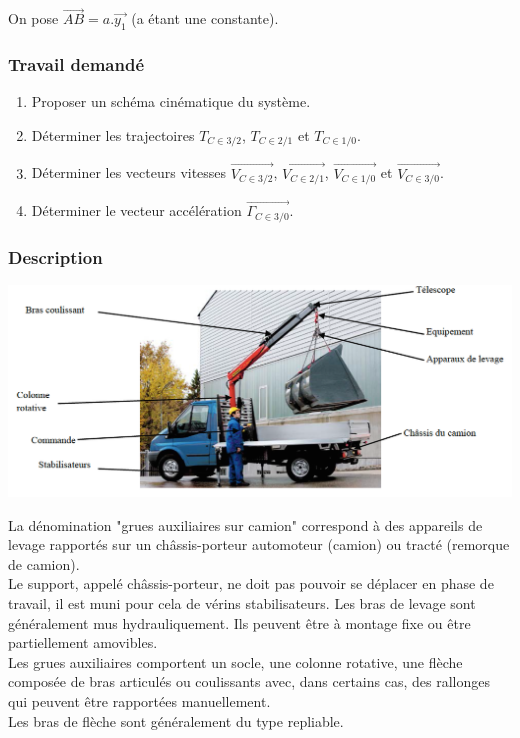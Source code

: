 On pose $\overrightarrow{AB} = a.\overrightarrow{y_1}$ (a étant une constante).

\subsubsection{Travail demandé}
\begin{enumerate}
\item Proposer un schéma cinématique du système.
\item Déterminer les trajectoires $T_{C\in3/2}$, $T_{C\in2/1}$ et $T_{C\in1/0}$.
\item Déterminer les vecteurs vitesses $\overrightarrow{V_{C\in3/2}}$, $\overrightarrow{V_{C\in2/1}}$, $\overrightarrow{V_{C\in1/0}}$ et $\overrightarrow{V_{C\in3/0}}$.
\item Déterminer le vecteur accélération $\overrightarrow{\Gamma_{C\in3/0}}$.
\end{enumerate}

\newpage



\subsubsection{Description}

\begin{center}
    \includegraphics[scale=0.3]{png/1_exo8.png}
\end{center}

La dénomination "grues auxiliaires sur camion" correspond à des appareils de levage rapportés sur un châssis-porteur automoteur (camion) ou tracté (remorque de camion).\\
Le support, appelé châssis-porteur, ne doit pas pouvoir se déplacer en phase de travail, il est muni pour cela de vérins stabilisateurs. Les bras de levage sont généralement mus hydrauliquement. Ils peuvent être à montage fixe ou être partiellement amovibles.\\
Les grues auxiliaires comportent un socle, une colonne rotative, une flèche composée de bras articulés ou coulissants avec, dans certains cas, des rallonges qui peuvent être rapportées manuellement.\\
Les bras de flèche sont généralement du type repliable.\\

